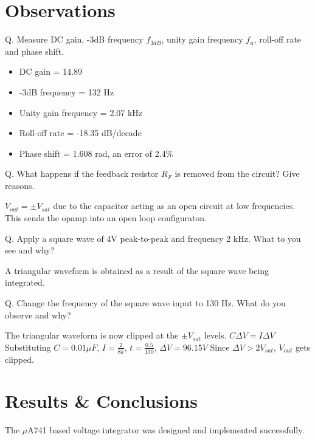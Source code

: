 \documentclass[12pt, titlepage]{article}
\theoremstyle{definition}
\begin{document}
  \newpage
  \section{Observations}
    Q. Measure DC gain, -3dB frequency $f_{3dB}$, unity gain frequency $f_u$, roll-off rate and phase shift.

    \begin{itemize}
      \item[] DC gain = 14.89
      \item[] -3dB frequency = 132 Hz
      \item[] Unity gain frequency = 2.07 kHz
      \item[] Roll-off rate = -18.35 dB/decade
      \item[] Phase shift = 1.608 rad, an error of 2.4\%
    \end{itemize}

    Q. What happens if the feedback resistor $R_{F}$ is removed from the circuit? Give reasons.

    $V_{out}=\pm V_{sat}$ due to the capacitor acting as an open circuit at low frequencies. This sends the opamp into an open loop configuraton.

    Q. Apply a square wave of 4V peak-to-peak and frequency 2 kHz. What to you see and why?

    A triangular waveform is obtained as a result of the square wave being integrated.

    Q. Change the frequency of the square wave input to 130 Hz. What do you observe and why?

    The triangular waveform is now clipped at the $\pm V_{sat}$ levels.
    $C\Delta V=I\Delta V$
    Substituting $C=0.01\mu F$, $I=\frac{2}{8k}$, $t=\frac{0.5}{130}$,
    $\Delta V = 96.15 V$
    Since $\Delta V > 2V_{sat}$, $V_{out}$ gets clipped.


  \newpage
  \section{Results \& Conclusions}
    The $\mu$A741 based voltage integrator was designed and implemented successfully.
\end{document}

